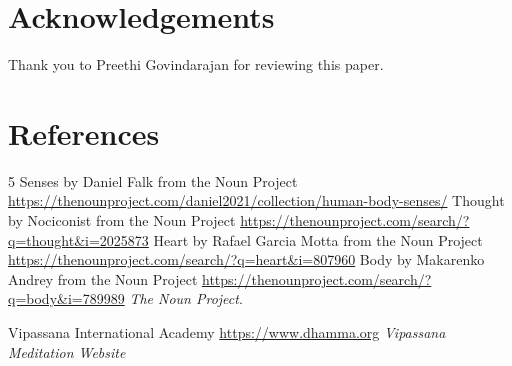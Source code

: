 \documentclass[a4paper, amsfonts, amssymb, amsmath, reprint, showkeys, nofootinbib, twoside]{revtex4-1}
\begin{document}
\section*{Acknowledgements}

Thank you to Preethi Govindarajan for reviewing this paper.


\section*{References}

\begin{thebibliography}{99}

  5 Senses by Daniel Falk from the Noun Project
  \url{https://thenounproject.com/daniel2021/collection/human-body-senses/}
  Thought by Nociconist from the Noun Project
  \url{https://thenounproject.com/search/?q=thought&i=2025873}
  Heart by Rafael Garcia Motta from the Noun Project
  \url{https://thenounproject.com/search/?q=heart&i=807960}
  Body by Makarenko Andrey from the Noun Project
  \url{https://thenounproject.com/search/?q=body&i=789989}
  \textit{The Noun Project}.

  Vipassana International Academy
  \url{https://www.dhamma.org}
  \textit{Vipassana Meditation Website}


\end{thebibliography}
\end{document}
